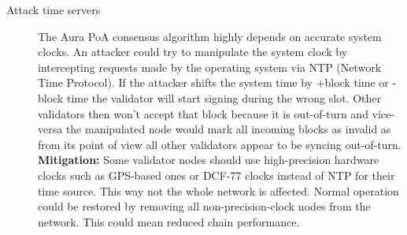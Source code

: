 \begin{description}

    \item[Attack time servers] 
        The Aura PoA consensus algorithm highly depends on accurate system clocks. An attacker could try to manipulate the system clock by intercepting requests made by the operating system via NTP (Network Time Protocol). If the attacker shifts the system time by +block time or -block time the validator will start signing during the wrong slot. Other validators then won't accept that block because it is out-of-turn and vice-versa the manipulated node would mark all incoming blocks as invalid as from its point of view all other validators appear to be syncing out-of-turn. \\
        \textbf{Mitigation:} Some validator nodes should use high-precision hardware clocks such as GPS-based ones or DCF-77 clocks instead of NTP for their time source. This way not the whole network is affected. Normal operation could be restored by removing all non-precision-clock nodes from the network. This could mean reduced chain performance.

\end{description}

